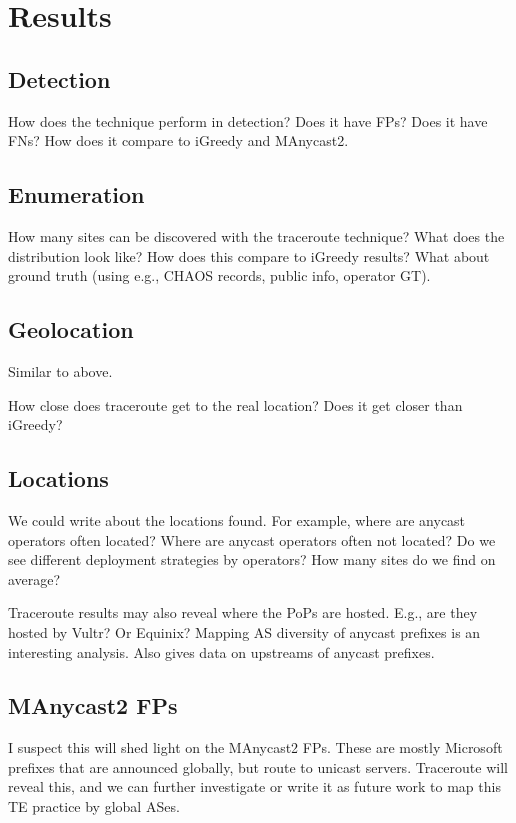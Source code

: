 
\section{Results}
\subsection{Detection}
How does the technique perform in detection? Does it have FPs? Does it have FNs?
How does it compare to iGreedy and MAnycast2.

\subsection{Enumeration}
How many sites can be discovered with the traceroute technique?
What does the distribution look like?
How does this compare to iGreedy results?
What about ground truth (using e.g., CHAOS records, public info, operator GT).

\subsection{Geolocation}
Similar to above.

How close does traceroute get to the real location?
Does it get closer than iGreedy?

\subsection{Locations}
We could write about the locations found.
For example, where are anycast operators often located?
Where are anycast operators often not located?
Do we see different deployment strategies by operators?
How many sites do we find on average?

Traceroute results may also reveal where the PoPs are hosted. E.g., are they hosted by Vultr? Or Equinix?
Mapping AS diversity of anycast prefixes is an interesting analysis.
Also gives data on upstreams of anycast prefixes.

\subsection{MAnycast2 FPs}
I suspect this will shed light on the MAnycast2 FPs.
These are mostly Microsoft prefixes that are announced globally, but route to unicast servers.
Traceroute will reveal this, and we can further investigate or write it as future work to map this TE practice by global ASes.
